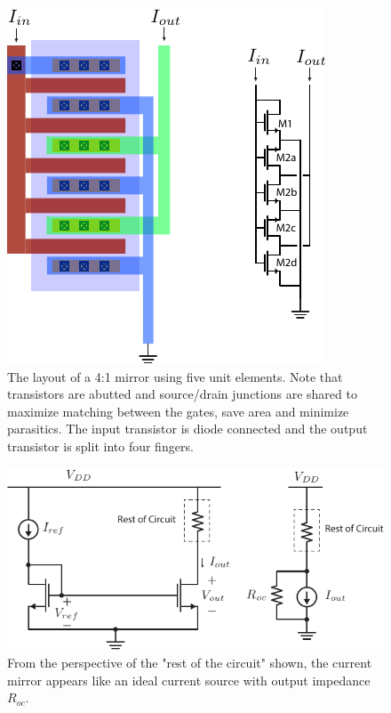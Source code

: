\begin{figure}[H]
\centering
\includegraphics[width=.8\columnwidth]{mirror_layout.pdf} 
\caption{The layout of a 4:1 mirror using five unit elements. Note that transistors are abutted and source/drain junctions are shared to maximize matching between the gates, save area and minimize parasitics.  The input transistor is diode connected and the output transistor is split into four fingers.}
\label{fig:mirror_layout}
\end{figure}
\newpage
\begin{figure}[t]
\centering
\includegraphics[scale=1.4]{7mirror_current_source.pdf}
\caption{From the perspective of the "rest of the circuit" shown, the current mirror appears like an ideal current source with output impedance $R_{oc}$.}
\label{fig:7mirror_current_source.pdf}
\end{figure}

